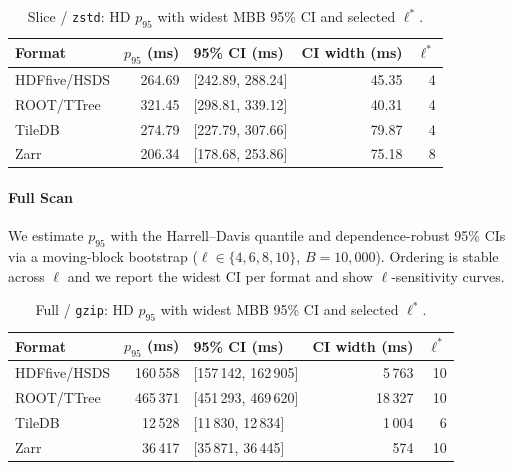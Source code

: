 \documentclass[nomenclature, english, bibtex]{kththesis}
\numberwithin{listing}{chapter}
\begin{document}
\begin{table}[H]
  \centering
  \caption{Slice / \texttt{zstd}: \gls{HD} $p_{95}$ with widest \gls{MBB} 95\% \gls{CI} and selected $\ell^{\ast}$.}
  \label{tab:tail-slice-zstd-p95-selected}
  \begin{tabular}{l r l r r}
    \toprule
    Format & $p_{95}$ (ms) & 95\% \gls{CI} (ms) & \gls{CI} width (ms) & $\ell^{\ast}$ \\
    \midrule
    \gls{HDFfive}/\gls{HSDS}   & 264.69 & [242.89, 288.24] & 45.35 & 4 \\
    \gls{ROOT}/\gls{TTree}   & 321.45 & [298.81, 339.12] & 40.31 & 4 \\
    TileDB & 274.79 & [227.79, 307.66] & 79.87 & 4 \\
    Zarr   & 206.34 & [178.68, 253.86] & 75.18 & 8 \\
    \bottomrule
  \end{tabular}
\end{table}

\paragraph{Full Scan}
We estimate $p_{95}$ with the Harrell–Davis quantile and dependence-robust 95\% \glspl{CI} via a moving-block bootstrap ($\ell\in\{4,6,8,10\}$, $B{=}10{,}000$). Ordering is stable across $\ell$ and we report the widest \gls{CI} per format and show $\ell$-sensitivity curves.

\begin{table}[H]
  \centering
  \caption{Full / \texttt{gzip}: \gls{HD} $p_{95}$ with widest \gls{MBB} 95\% \gls{CI} and selected $\ell^{\ast}$.}
  \label{tab:tail-full-gzip-p95-selected}
  \begin{tabular}{l r l r r}
    \toprule
    Format & $p_{95}$ (ms) & 95\% \gls{CI} (ms) & \gls{CI} width (ms) & $\ell^{\ast}$ \\
    \midrule
    \gls{HDFfive}/\gls{HSDS}   & 160\,558 & [157\,142, 162\,905] & 5\,763 & 10 \\
    \gls{ROOT}/\gls{TTree}   & 465\,371 & [451\,293, 469\,620] & 18\,327 & 10 \\
    TileDB & 12\,528  & [11\,830, 12\,834]   & 1\,004  & 6 \\
    Zarr   & 36\,417  & [35\,871, 36\,445]   & 574     & 10 \\
    \bottomrule
  \end{tabular}
\end{table}
\end{document}

